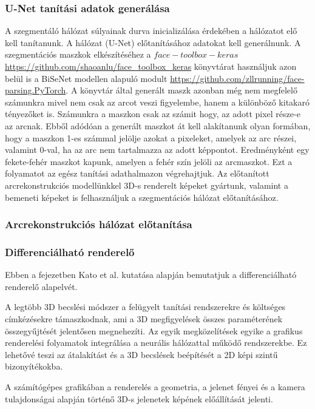 \documentclass[12pt,a4]{article}
\begin{document}
    \subsubsection{U-Net tanítási adatok generálása}
    A szegmentáló hálózat súlyainak durva inicializálása érdekében a hálózatot elő kell tanítanunk. A hálózat (U-Net) előtanításához adatokat kell generálnunk. A szegmentációs maszkok elkészítéséhez a $face-toolbox-keras$ \url{https://github.com/shaoanlu/face_toolbox_keras} könyvtárat használjuk azon belül is a BiSeNet modellen alapuló modult \url{https://github.com/zllrunning/face-parsing.PyTorch}. A könyvtár által generált maszk azonban még nem megfelelő számunkra mivel nem csak az arcot veszi figyelembe, hanem a különböző kitakaró tényezőket is. Számunkra a maszkon csak az számit hogy, az adott pixel része-e az arcnak. Ebből adódóan a generált maszkot át kell alakítanunk olyan formában, hogy a maszkon 1-es számmal jelölje azokat a pixeleket, amelyek az arc részei, valamint 0-val, ha az arc nem tartalmazza az adott képpontot. Eredményként egy fekete-fehér maszkot kapunk, amelyen a fehér szín jelöli az arcmaszkot. Ezt a folyamatot az egész tanítási adathalmazon végrehajtjuk. 
    Az előtanított arcrekonstrukciós modellünkkel 3D-s renderelt képeket gyártunk, valamint a bemeneti képeket is felhasználjuk a szegmentációs hálózat előtanításához.
    

    \subsubsection{Arcrekonstrukciós hálózat előtanítása}
    
    \subsubsection{Differenciálható renderelő}

    Ebben a fejezetben Kato et al. \cite{diffrenderer} kutatása alapján bemutatjuk a differenciálható renderelő alapelvét.

    A legtöbb 3D becslési módszer a
felügyelt tanítási rendszerekre és költséges címkézésekre támaszkodnak, ami
a 3D megfigyelések összes paraméterének összegyűjtését jelentősen megnehezíti.
Az egyik
megközelítések egyike a grafikus renderelési folyamatok integrálása
a neurális hálózattal működő rendszerekbe. Ez lehetővé teszi az átalakítást és
a 3D becslések beépítését a 2D képi szintű bizonyítékokba.

A számítógépes grafikában a renderelés a geometria, a jelenet fényei és a kamera tulajdonságai alapján történő 3D-s jelenetek képének előállítását jelenti.
\end{document}
